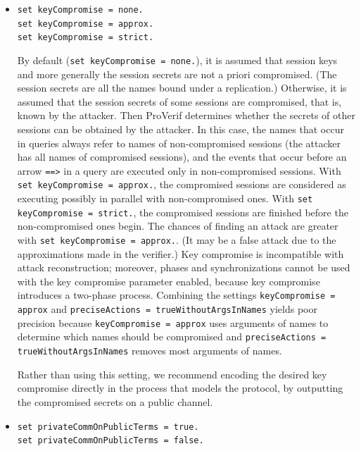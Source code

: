 \documentclass{book}
\begin{document}
\begin{itemize}
\item \lstinline{set keyCompromise = none.}\\
\lstinline{set keyCompromise = approx.}\\
\lstinline{set keyCompromise = strict.}


By default (\lstinline{set keyCompromise = none.}), it is assumed that
session keys and more generally the session secrets are not a priori
compromised. (The session secrets are all the names bound under a
replication.) Otherwise, it is assumed that the session secrets of
some sessions are compromised, that is, known by the attacker.  Then
ProVerif determines whether the secrets of other sessions can be
obtained by the attacker. In this case, the names that occur in
queries always refer to names of non-compromised sessions (the
attacker has all names of compromised sessions), and the events that
occur before an arrow \lstinline{==>} in a query are executed only in
non-compromised sessions.
With \lstinline{set keyCompromise = approx.}, the compromised sessions
are considered as executing possibly in parallel with non-compromised ones.
With \lstinline{set keyCompromise = strict.}, the compromised sessions
are finished before the non-compromised ones begin. The chances of finding an
attack are greater with \lstinline{set keyCompromise = approx.}. (It may
be a false attack due to the approximations made in the verifier.)
Key compromise is incompatible with attack reconstruction; moreover,
phases and synchronizations cannot be used with the key compromise parameter enabled,
because key compromise introduces a two-phase process.
Combining the settings \lstinline{keyCompromise = approx} and
\lstinline{preciseActions = trueWithoutArgsInNames} yields poor precision
because \lstinline{keyCompromise = approx} uses arguments of names
to determine which names should be compromised and
\lstinline{preciseActions = trueWithoutArgsInNames} removes
most arguments of names.

Rather than using this setting, we recommend encoding the
desired key compromise directly in the process that models the
protocol, by outputting the compromised secrets on a public channel.

\item \lstinline{set privateCommOnPublicTerms = true.}\\
\lstinline{set privateCommOnPublicTerms = false.}


\end{itemize}
\end{document}
